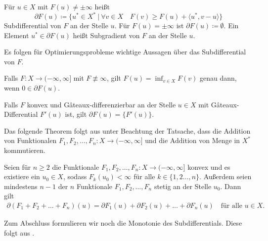 \begin{definition}[Subdifferential]
  \label{def:subdifferential}
  Für $u\in X$ mit $F(u)\neq\pm\infty$ heißt
  \begin{equation}
    \label{eq:subdifferential}
    \partial F(u)\coloneqq
    \{u^\ast\in X^\ast\ |\ 
    \forall v\in X\quad F(v)\geq F(u)+\langle u^\ast,v-u\rangle\}  
  \end{equation}
  Subdifferential von $F$ an der Stelle $u$. Für $F(u)=\pm\infty$ ist
  $\partial F(u)\coloneq\emptyset$.
  Ein Element $u^\ast\in\partial F(u)$ heißt Subgradient von $F$ an der Stelle
  $u$.
\end{definition}

Es folgen für Optimierungsprobleme wichtige Aussagen über das Subdifferential 
von $F$.

\begin{theorem}
  \label{thm:extremalprinciple}
  Falls $F: X\to (-\infty,\infty]$ mit $F\nequiv\infty$, gilt
  $F(u)=\inf_{v\in X}F(v)$ genau dann, wenn $0\in\partial F(u)$.
\end{theorem}

\begin{theorem}[\protect{\cite[S. 387, Proposition 47.13 (i)]{Zei85}}]
  \label{thm:subdiffGateaux}
  Falls $F$ konvex und G\^{a}teaux-differenzierbar an der Stelle $u\in X$ mit
  G\^{a}teaux-Differential $F'(u)$ ist, gilt $\partial F(u)=\{F'(u)\}$.
\end{theorem}

Das folgende Theorem folgt aus \cite[S. 389, Theorem 47.B]{Zei85} unter 
Beachtung der Tatsache, dass die Addition von Funktionalen 
$F_1,F_2,\ldots,F_n:X\to (-\infty,\infty]$ und die Addition von
Menge in $X^\ast$ kommutieren.

\begin{theorem}
  \label{thm:subdifferentialSumRule}
  Seien für $n\geq 2$ die Funktionale $F_1,F_2,\ldots,F_n: X\to
  (-\infty,\infty]$ konvex und es existiere ein $u_0\in X$, sodass
  $F_k(u_0)<\infty$ für alle $k\in\{1,2\ldots,n\}$. 
  Außerdem seien mindestens $n-1$ der $n$ Funktionale $F_1,F_2,\ldots,F_n$
  stetig an der Stelle $u_0$.
  Dann gilt 
  \begin{align*}
    \partial (F_1+F_2+\ldots+ F_n)(u) 
    = \partial F_1(u)+\partial F_2(u)+ \ldots + \partial F_n(u) \quad\text{für
    alle } u\in X.
  \end{align*}
\end{theorem}

Zum Abschluss formulieren wir noch die Monotonie des Subdifferentials.
Diese folgt aus \cite[S. 396 f., Definition 47.15, Theorem 47.F (1)]{Zei85}.

